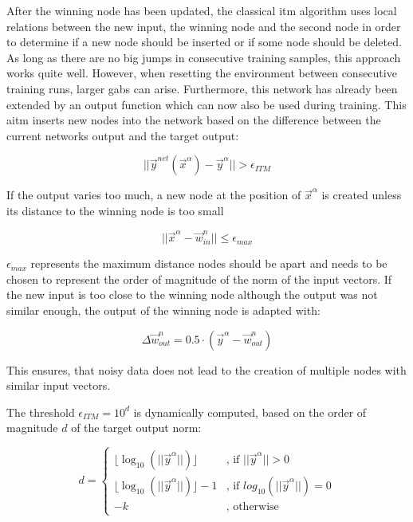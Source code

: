 After the winning node has been updated, the classical \gls{itm} algorithm uses local relations between the new input, the winning node and the second node in order to determine if a new node should be inserted or if some node should be deleted. As long as there are no big jumps in consecutive training samples, this approach works quite well. However, when resetting the environment between consecutive training runs, larger gabs can arise. Furthermore, this network has already been extended by an output function which can now also be used during training. This \gls{aitm} inserts new nodes into the network based on the difference between the current networks output and the target output:

\begin{equation}
||\vec{y}^{net}(\vec{x}^\alpha)-\vec{y}^\alpha|| > \epsilon_{ITM}
\end{equation}

If the output varies too much, a new node at the position of $\vec{x}^\alpha$ is created unless its distance to the winning node is too small

\begin{equation}
||\vec{x}^\alpha - \vec{w}^n_{in}|| \le \epsilon_{max}
\end{equation}

$\epsilon_{max}$ represents the maximum distance nodes should be apart and needs to be chosen to represent the order of magnitude of the norm of the input vectors.
If the new input is too close to the winning node although the output was not similar enough, the output of the winning node is adapted with:

\begin{equation}
\Delta\vec{w}^n_{out} = 0.5 \cdot (\vec{y}^\alpha - \vec{w}^n_{out})
\end{equation}

This ensures, that noisy data does not lead to the creation of multiple nodes with similar input vectors. 

The threshold $\epsilon_{ITM} = 10^d$ is dynamically computed, based on the order of magnitude $d$ of the target output norm:

\begin{equation}
d = \begin{cases}
\lfloor\log_{10}(||\vec{y}^\alpha||)\rfloor & \text{, if $||\vec{y}^\alpha|| > 0$} \\
\lfloor\log_{10}(||\vec{y}^\alpha||)\rfloor-1 & \text{, if $log_{10}(||\vec{y}^\alpha||) = 0$} \\
-k & \text{, otherwise}
\end{cases}
\end{equation}

